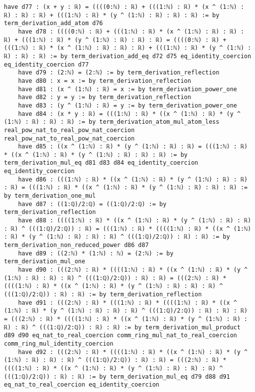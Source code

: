 \documentclass{article}
\begin{document}
\begin{tcolorbox}[colback=white!10, width=\linewidth]
\begin{lstlisting}[language=Lean4]
    have d77 : (x + y : ℝ) = ((((0:ℕ) : ℝ) + (((1:ℕ) : ℝ) * (x ^ (1:ℕ) : ℝ) : ℝ) : ℝ) + (((1:ℕ) : ℝ) * (y ^ (1:ℕ) : ℝ) : ℝ) : ℝ) := by term_derivation_add_atom d76
    have d78 : ((((0:ℕ) : ℝ) + (((1:ℕ) : ℝ) * (x ^ (1:ℕ) : ℝ) : ℝ) : ℝ) + (((1:ℕ) : ℝ) * (y ^ (1:ℕ) : ℝ) : ℝ) : ℝ) = ((((0:ℕ) : ℝ) + (((1:ℕ) : ℝ) * (x ^ (1:ℕ) : ℝ) : ℝ) : ℝ) + (((1:ℕ) : ℝ) * (y ^ (1:ℕ) : ℝ) : ℝ) : ℝ) := by term_derivation_add_eq d72 d75 eq_identity_coercion eq_identity_coercion d77
    have d79 : (2:ℕ) = (2:ℕ) := by term_derivation_reflection
    have d80 : x = x := by term_derivation_reflection
    have d81 : (x ^ (1:ℕ) : ℝ) = x := by term_derivation_power_one
    have d82 : y = y := by term_derivation_reflection
    have d83 : (y ^ (1:ℕ) : ℝ) = y := by term_derivation_power_one
    have d84 : (x * y : ℝ) = (((1:ℕ) : ℝ) * ((x ^ (1:ℕ) : ℝ) * (y ^ (1:ℕ) : ℝ) : ℝ) : ℝ) := by term_derivation_atom_mul_atom_less real_pow_nat_to_real_pow_nat_coercion real_pow_nat_to_real_pow_nat_coercion
    have d85 : ((x ^ (1:ℕ) : ℝ) * (y ^ (1:ℕ) : ℝ) : ℝ) = (((1:ℕ) : ℝ) * ((x ^ (1:ℕ) : ℝ) * (y ^ (1:ℕ) : ℝ) : ℝ) : ℝ) := by term_derivation_mul_eq d81 d83 d84 eq_identity_coercion eq_identity_coercion
    have d86 : (((1:ℕ) : ℝ) * ((x ^ (1:ℕ) : ℝ) * (y ^ (1:ℕ) : ℝ) : ℝ) : ℝ) = (((1:ℕ) : ℝ) * ((x ^ (1:ℕ) : ℝ) * (y ^ (1:ℕ) : ℝ) : ℝ) : ℝ) := by term_derivation_one_mul
    have d87 : ((1:ℚ)/2:ℚ) = ((1:ℚ)/2:ℚ) := by term_derivation_reflection
    have d88 : ((((1:ℕ) : ℝ) * ((x ^ (1:ℕ) : ℝ) * (y ^ (1:ℕ) : ℝ) : ℝ) : ℝ) ^ (((1:ℚ)/2:ℚ)) : ℝ) = (((1:ℕ) : ℝ) * ((((1:ℕ) : ℝ) * ((x ^ (1:ℕ) : ℝ) * (y ^ (1:ℕ) : ℝ) : ℝ) : ℝ) ^ (((1:ℚ)/2:ℚ)) : ℝ) : ℝ) := by term_derivation_non_reduced_power d86 d87
    have d89 : ((2:ℕ) * (1:ℕ) : ℕ) = (2:ℕ) := by term_derivation_mul_one
    have d90 : (((2:ℕ) : ℝ) * ((((1:ℕ) : ℝ) * ((x ^ (1:ℕ) : ℝ) * (y ^ (1:ℕ) : ℝ) : ℝ) : ℝ) ^ (((1:ℚ)/2:ℚ)) : ℝ) : ℝ) = (((2:ℕ) : ℝ) * ((((1:ℕ) : ℝ) * ((x ^ (1:ℕ) : ℝ) * (y ^ (1:ℕ) : ℝ) : ℝ) : ℝ) ^ (((1:ℚ)/2:ℚ)) : ℝ) : ℝ) := by term_derivation_reflection
    have d91 : (((2:ℕ) : ℝ) * (((1:ℕ) : ℝ) * ((((1:ℕ) : ℝ) * ((x ^ (1:ℕ) : ℝ) * (y ^ (1:ℕ) : ℝ) : ℝ) : ℝ) ^ (((1:ℚ)/2:ℚ)) : ℝ) : ℝ) : ℝ) = (((2:ℕ) : ℝ) * ((((1:ℕ) : ℝ) * ((x ^ (1:ℕ) : ℝ) * (y ^ (1:ℕ) : ℝ) : ℝ) : ℝ) ^ (((1:ℚ)/2:ℚ)) : ℝ) : ℝ) := by term_derivation_mul_product d89 d90 eq_nat_to_real_coercion comm_ring_mul_nat_to_real_coercion comm_ring_mul_identity_coercion
    have d92 : (((2:ℕ) : ℝ) * ((((1:ℕ) : ℝ) * ((x ^ (1:ℕ) : ℝ) * (y ^ (1:ℕ) : ℝ) : ℝ) : ℝ) ^ (((1:ℚ)/2:ℚ)) : ℝ) : ℝ) = (((2:ℕ) : ℝ) * ((((1:ℕ) : ℝ) * ((x ^ (1:ℕ) : ℝ) * (y ^ (1:ℕ) : ℝ) : ℝ) : ℝ) ^ (((1:ℚ)/2:ℚ)) : ℝ) : ℝ) := by term_derivation_mul_eq d79 d88 d91 eq_nat_to_real_coercion eq_identity_coercion

\end{lstlisting}
\end{tcolorbox}
\end{document}
